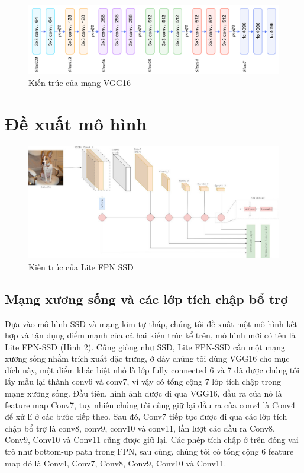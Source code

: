 \documentclass[a4paper]{article}
\begin{document}
\begin{figure}[h]
	\centering
	\includegraphics[width=0.9\linewidth]{fig/network}
	\caption{Kiến trúc của mạng VGG16}
	\label{fig:network}
\end{figure}

\section{\textbf{Đề xuất mô hình}}

\begin{figure}[h]
	\centering
	\includegraphics[width=0.9\linewidth]{fig/z5092847353686_14a2d2b2f8b64488c84035ba08549781}
	\caption{Kiến trúc của Lite FPN SSD}
	\label{fig:FPNSSD}
\end{figure}

\subsection{\textbf{Mạng xương sống và các lớp tích chập bổ trợ}}
Dựa vào mô hình SSD và mạng kim tự tháp, chúng tôi đề xuất một mô hình kết hợp và tận dụng điểm mạnh của cả hai kiến trúc kể trên, mô hình mới có tên là Lite FPN-SSD (Hình \ref{fig:FPNSSD}).
Cũng giống như SSD, Lite FPN-SSD cần một mạng xương sống nhằm trích xuất đặc trưng, ở đây chúng tôi dùng VGG16 cho mục đích này, một điểm khác biệt nhỏ là lớp fully connected 6 và 7 đã được chúng tôi lấy mẫu lại thành conv6 và conv7, vì vậy có tổng cộng 7 lớp tích chập trong mạng xương sống. Đầu tiên, hình ảnh được đi qua VGG16, đầu ra của nó là feature map Conv7,  tuy nhiên chúng tôi cũng giữ lại đầu ra của conv4 là Conv4 để xử lí ở các bước tiếp theo. Sau đó, Conv7 tiếp tục được đi qua các lớp tích chập bổ trợ là conv8, conv9, conv10 và conv11, lần lượt các đầu ra Conv8, Conv9, Conv10 và Conv11 cũng được giữ lại. Các phép tích chập ở trên đóng vai trò như bottom-up path trong FPN, sau cùng, chúng tôi có tổng cộng 6 feature map đó là Conv4, Conv7,  Conv8, Conv9, Conv10 và Conv11. 
\end{document}
